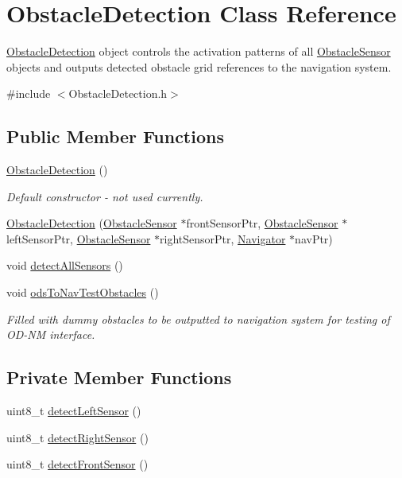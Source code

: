 \hypertarget{class_obstacle_detection}{}\section{Obstacle\+Detection Class Reference}
\label{class_obstacle_detection}


\mbox{\hyperlink{class_obstacle_detection}{Obstacle\+Detection}} object controls the activation patterns of all \mbox{\hyperlink{class_obstacle_sensor}{Obstacle\+Sensor}} objects and outputs detected obstacle grid references to the navigation system.  




{\ttfamily \#include $<$Obstacle\+Detection.\+h$>$}

\subsection*{Public Member Functions}
\begin{DoxyCompactItemize}
\item 
\mbox{\hyperlink{class_obstacle_detection_a1ef460cae951b0ddaa04088645109f47}{Obstacle\+Detection}} ()
\begin{DoxyCompactList}\small\item\em Default constructor -\/ not used currently. \end{DoxyCompactList}\item 
\mbox{\hyperlink{class_obstacle_detection_ab70842be18c993b94612f17b653f3674}{Obstacle\+Detection}} (\mbox{\hyperlink{class_obstacle_sensor}{Obstacle\+Sensor}} $\ast$front\+Sensor\+Ptr, \mbox{\hyperlink{class_obstacle_sensor}{Obstacle\+Sensor}} $\ast$left\+Sensor\+Ptr, \mbox{\hyperlink{class_obstacle_sensor}{Obstacle\+Sensor}} $\ast$right\+Sensor\+Ptr, \mbox{\hyperlink{class_navigator}{Navigator}} $\ast$nav\+Ptr)
\item 
void \mbox{\hyperlink{class_obstacle_detection_afe8d20425157946ba8e562d9696fef86}{detect\+All\+Sensors}} ()
\item 
void \mbox{\hyperlink{class_obstacle_detection_a4977cf4929ce5b8ec1b42353df9bd2b7}{ods\+To\+Nav\+Test\+Obstacles}} ()
\begin{DoxyCompactList}\small\item\em Filled with dummy obstacles to be outputted to navigation system for testing of O\+D-\/\+NM interface. \end{DoxyCompactList}\end{DoxyCompactItemize}
\subsection*{Private Member Functions}
\begin{DoxyCompactItemize}
\item 
uint8\+\_\+t \mbox{\hyperlink{class_obstacle_detection_adbb2c4295e35c5c4c2b63aed42588bd0}{detect\+Left\+Sensor}} ()
\item 
uint8\+\_\+t \mbox{\hyperlink{class_obstacle_detection_a135adf6077c8af44e33e6814ad7ee9f0}{detect\+Right\+Sensor}} ()
\item 
uint8\+\_\+t \mbox{\hyperlink{class_obstacle_detection_aa7974520bcbaa2d10254fb498347b8c3}{detect\+Front\+Sensor}} ()
\end{DoxyCompactItemize}
